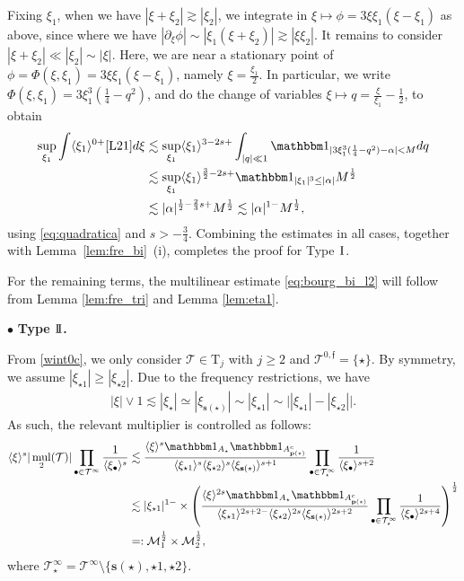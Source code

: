 \documentclass[%
11pt,  reqno]{amsart}
\newcommand{\I}{\hspace{0.2mm}\textup{I}\hspace{0.2mm}}
\newcommand{\II}{\textup{I \hspace{-2.9mm} I} }
\newcommand{\5}{\textup{V}}
\newcommand{\noi}{\noindent}
\newcommand{\ind}{\mathbbm 1}
\newcommand{\les}{\lesssim}
\theoremstyle{remark}
\newcommand{\bul}{\bullet}
\newcommand{\TT}{\mathcal{T}}
\newcommand{\Tr}{\mathrm{T}}
\newcommand{\al}{\alpha}
\newcommand{\pb}{\mathbf{p}}
\newcommand{\sbf}{\mathbf{s}}
\newcommand{\ges}{\gtrsim}
\newcommand{\jb}[1]
{\langle #1 \rangle}
\newcommand{\ff}{\mathfrak{f}}
\newcommand{\M}{\mathcal{M}}
\DeclareMathOperator{\mul}{mul}
\numberwithin{equation}{section}
\numberwithin{theorem}{section}
\begin{document}
Fixing $\xi_1$, when we have $|\xi+\xi_2| \ges |\xi_2|$, we integrate in $\xi \mapsto \phi = 3 \xi \xi_1 (\xi-\xi_1)$ as above, since
where we have $|\partial_\xi \phi | \sim |\xi_1 (\xi + \xi_2)| \ges |\xi \xi_2|$. 
It remains to consider $|\xi + \xi_2| \ll |\xi_2| \sim |\xi|$. Here, we are near a stationary point of $\phi = \Phi(\xi,\xi_1) = 3 \xi \xi_1 (\xi-\xi_1)$, namely $\xi = \frac{\xi_1}{2}$. In particular, we write $\Phi(\xi, \xi_1) =3  \xi_1^3 (\frac14 - q^2)$, and do the change of variables $\xi \mapsto q = \frac{\xi}{\xi_1} - \frac12$, to obtain 
\begin{align}
\sup_{\xi_1} \int \jb{\xi_1}^{0+} \eqref{L21} d\xi 
&
\les 
\sup_{\xi_1} \jb{\xi_1}^{3-2s + }  \int_{|q| \ll 1} \ind_{| 3 \xi_1^3 (\frac14 - q^2) - \al| < M } d q
\\
&
\les 
\sup_{\xi_1} \jb{\xi_1}^{\frac32 -2s + } \ind_{|\xi_1|^3 \le |\al|} M^\frac12
\\
&
\les 
|\al|^{\frac12 - \frac23 s +} M^\frac12
\les |\al|^{1-} M^{\frac12}, 
\end{align}
using  \eqref{eq:quadratica} and   $s>-\frac34$.
Combining the estimates in all cases, together with Lemma~\ref{lem:fre_bi}~(i), completes the proof for Type $\I$.



\medskip

For the remaining terms, the multilinear estimate \eqref{eq:bourg_bi_l2} will follow from Lemma \ref{lem:fre_tri} and Lemma \ref{lem:eta1}.

\medskip

\noi
$\bul$ \textbf{Type $\II$.}


From \eqref{wint0c}, we only consider $\TT\in \Tr_j$ with $j\ge 2$ and $\TT^{0,\ff} = \{\star\}$. 
By symmetry, we assume $|\xi_{\star1}| \ge |\xi_{\star2}|$. Due to the frequency restrictions, we have
\begin{align}
|\xi| \lor 1 
 \les |\xi_{\star}| \simeq |\xi_{\sbf(\star)}| 
\sim 
|\xi_{\star1}| 
\sim 
\big| |\xi_{\star1} | - |\xi_{\star2}| \big| 
.
\end{align}
As such, the relevant multiplier is controlled as follows:
\begin{align}\label{L22_1}
\jb{\xi}^s |\mul_2(\TT)|  \prod_{\bul \in \TT^\infty} \frac{1}{\jb{\xi_\bul}^s}
&
\les \frac{\jb{\xi}^s \ind_{A_\star} \ind_{A^c_{\pb(\star)}} }{ \jb{\xi_{\star1}}^s \jb{\xi_{\star2}}^s  \jb{\xi_{\sbf(\star)}}^{s+1} } \prod_{\bul \in \TT^{\infty}_\star} \frac{1}{\jb{\xi_{\bul}}^{s+2}}
\\ 
& 
\lesssim 
|\xi_{\star1}|^{1-}
\times 
\left(\frac{\jb{\xi}^{2s} \ind_{A_\star} \ind_{A^c_{\pb(\star)}} }{ \jb{\xi_{\star1}}^{2s+2-} \jb{\xi_{\star2}}^{2s}  \jb{\xi_{\sbf(\star)}}^{2s+2} } \prod_{\bul \in \TT^{\infty}_\star} \frac{1}{\jb{\xi_{\bul}}^{2s+4}}\right)^{\frac12}
\\
&
=:\mathcal{M}_1^{\frac12}
\times 
\M_2^\frac12
, 
\end{align}
where $\TT^\infty_\star = \TT^\infty \setminus \{\sbf(\star), \star1, \star2\}$. 
\end{document}
